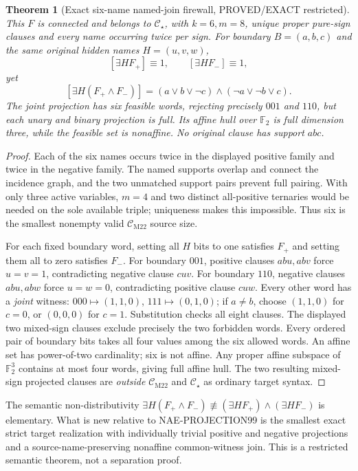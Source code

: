 \documentclass[11pt]{article}
\newtheorem{theorem}{Theorem}
\newcommand{\CM}{\mathcal C_{\mathrm{M22}}}
\newcommand{\CS}{\mathcal C_\star}
\begin{document}
\begin{theorem}[Exact six-name named-join firewall, PROVED/EXACT restricted]
This $F$ is connected and belongs to $\CS$, with $k=6,m=8$, unique proper pure-sign clauses and every name occurring twice per sign. For boundary $B=(a,b,c)$ and the \emph{same original hidden names} $H=(u,v,w)$,
\[
 [\exists H F_+]\equiv1,\qquad [\exists H F_-]\equiv1,
\]
yet
\[
 \boxed{[\exists H(F_+\land F_-)]=(a\lor b\lor\neg c)\land
                  (\neg a\lor\neg b\lor c).}
\]
The joint projection has six feasible words, rejecting precisely $001$ and $110$, but each unary and binary projection is full. Its affine hull over $\mathbb F_2$ is full dimension three, while the feasible set is nonaffine. No original clause has support $abc$.
\end{theorem}
\begin{proof}
Each of the six names occurs twice in the displayed positive family and twice in the negative family. The named supports overlap and connect the incidence graph, and the two unmatched support pairs prevent full pairing. With only three active variables, $m=4$ and two distinct all-positive ternaries would be needed on the sole available triple; uniqueness makes this impossible. Thus six is the smallest nonempty valid $\CM$ source size.

For each fixed boundary word, setting all $H$ bits to one satisfies $F_+$ and setting them all to zero satisfies $F_-$. For boundary $001$, positive clauses $abu,abv$ force $u=v=1$, contradicting negative clause $cuv$. For boundary $110$, negative clauses $abu,abw$ force $u=w=0$, contradicting positive clause $cuw$. Every other word has a \emph{joint} witness: $000\mapsto(1,1,0)$, $111\mapsto(0,1,0)$; if $a\ne b$, choose $(1,1,0)$ for $c=0$, or $(0,0,0)$ for $c=1$. Substitution checks all eight clauses. The displayed two mixed-sign clauses exclude precisely the two forbidden words. Every ordered pair of boundary bits takes all four values among the six allowed words. An affine set has power-of-two cardinality; six is not affine. Any proper affine subspace of $\mathbb F_2^3$ contains at most four words, giving full affine hull. The two resulting mixed-sign projected clauses are \emph{outside} $\CM$ and $\CS$ as ordinary target syntax.
\end{proof}

The semantic non-distributivity $\exists H(F_+\land F_-)\not\equiv(\exists H F_+)\land(\exists H F_-)$ is elementary. What is new relative to NAE-PROJECTION99 is the smallest exact strict target realization with individually trivial positive and negative projections and a source-name-preserving nonaffine common-witness join. This is a restricted semantic theorem, not a separation proof.
\end{document}
